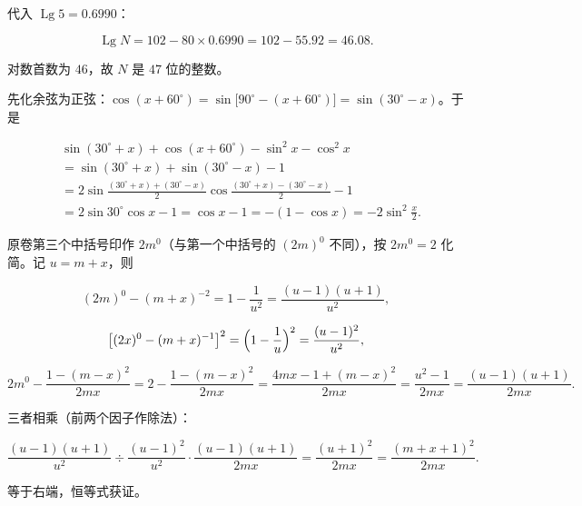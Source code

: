 \begin{answer}
代入 $\operatorname{Lg}5=0.6990$：

\nopagebreak[4]
\[
\operatorname{Lg}N=102-80\times0.6990=102-55.92=46.08.
\]

对数首数为 $46$，故 $N$ 是 $47$ 位的整数。


先化余弦为正弦：$\cos(x+60^\circ)=\sin\bigl[90^\circ-(x+60^\circ)\bigr]=\sin(30^\circ-x)$。于是

\nopagebreak[4]
\[
\begin{aligned}
&\sin(30^\circ+x)+\cos(x+60^\circ)-\sin^2x-\cos^2x\\
&=\sin(30^\circ+x)+\sin(30^\circ-x)-1\\
&=2\sin\frac{(30^\circ+x)+(30^\circ-x)}2\cos\frac{(30^\circ+x)-(30^\circ-x)}2-1\\
&=2\sin30^\circ\cos x-1=\cos x-1=-(1-\cos x)
=-2\sin^2\frac x2.
\end{aligned}
\]


原卷第三个中括号印作 $2m^0$（与第一个中括号的 $(2m)^0$ 不同），按 $2m^0=2$ 化简。记 $u=m+x$，则

\nopagebreak[4]
\[
(2m)^0-(m+x)^{-2}=1-\frac1{u^2}=\frac{(u-1)(u+1)}{u^2},
\]

\nopagebreak[4]
\[
\bigl[(2x)^0-(m+x)^{-1}\bigr]^2=\Bigl(1-\frac1u\Bigr)^2=\frac{(u-1)^2}{u^2},
\]

\nopagebreak[4]
\[
2m^0-\frac{1-(m-x)^2}{2mx}
=2-\frac{1-(m-x)^2}{2mx}
=\frac{4mx-1+(m-x)^2}{2mx}
=\frac{u^2-1}{2mx}
=\frac{(u-1)(u+1)}{2mx}.
\]

三者相乘（前两个因子作除法）：

\nopagebreak[4]
\[
\frac{(u-1)(u+1)}{u^2}\div\frac{(u-1)^2}{u^2}\cdot\frac{(u-1)(u+1)}{2mx}
=\frac{(u+1)^2}{2mx}
=\frac{(m+x+1)^2}{2mx}.
\]

等于右端，恒等式获证。





\end{answer}
